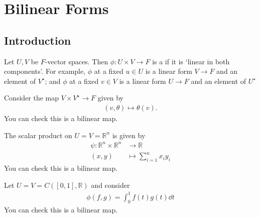 \section{Bilinear Forms}
\subsection{Introduction}
\begin{definition}
	Let $U, V$ be $F$-vector spaces.
	Then $\phi \colon U \times V \to F$ is a  if it is `linear in both components'.
	For example, $\phi$ at a fixed $u \in U$ is a linear form $V \to F$ and an element of $V^\star$; and $\phi$ at a fixed $v \in V$ is a linear form $U \to F$ and an element of $U^\star$
\end{definition}

\begin{example}
	Consider the map $V \times V^\star \to F$ given by
	\begin{align*}
		(v, \theta) \mapsto \theta(v).
	\end{align*}
	You can check this is a bilinear map.
\end{example}

\begin{example}
	The scalar product on $U = V = \mathbb R^n$ is given by
	\begin{align*}
		\psi: \mathbb{R}^n \times \mathbb{R}^n &\to \mathbb{R} \\
		(x, y) &\mapsto \sum_{i=1}^n x_i y_i
	\end{align*}
	You can check this is a bilinear map.
\end{example}

\begin{example}
	Let $U = V = C([0,1], \mathbb R)$ and consider
	\begin{align*}
		\phi(f,g) = \int_0^1 f(t)g(t) \dd{t}
	\end{align*}
	You can check this is a bilinear map.
\end{example}

